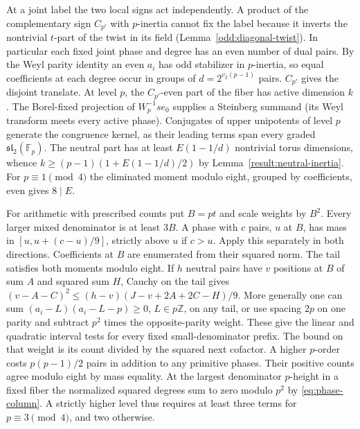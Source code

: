 \documentclass[11pt]{amsart}
\numberwithin{equation}{section}
\theoremstyle{definition}
\theoremstyle{plain}
\newcommand{\ZZ}{\mathbb Z}
\begin{document}
At a joint label the two local signs act independently. A product
of the complementary sign $C_{p'}$ with $p$-inertia cannot fix the
label because it inverts the nontrivial $t$-part of the twist in its
field (Lemma~\ref{odd:diagonal-twist}). In particular each fixed joint
phase and degree has an even number of dual pairs. By the Weyl parity
identity an even $a_i$ has odd stabilizer in $p$-inertia, so equal
coefficients at each degree occur in groups of $d=2^{v_2(p-1)}$ pairs.
$C_{p'}$ gives the disjoint translate. At level $p$, the $C_{p'}$-even
part of the fiber has active dimension $k$. The Borel-fixed projection
of $W_p^{-1}se_0$ supplies a Steinberg summand (its Weyl transform meets
every active phase). Conjugates of upper unipotents of level $p$ generate
the congruence kernel, as their leading terms span every graded
$\mathfrak{sl}_2(\mathbb F_p)$. The neutral part has at least $E(1-1/d)$
nontrivial torus dimensions, whence
$k\ge(p-1)(1+E(1-1/d)/2)$ by Lemma~\ref{result:neutral-inertia}.
For $p\equiv1\pmod4$ the eliminated moment modulo eight, grouped by
coefficients, even gives $8\mid E$.

For arithmetic with prescribed counts put $B=pt$ and scale weights by
$B^2$. Every larger mixed denominator is at least $3B$. A phase with
$c$ pairs, $u$ at $B$, has mass in $[u,u+(c-u)/9]$, strictly above $u$
if $c>u$. Apply this separately in both directions. Coefficients at $B$
are enumerated from their squared norm. The tail satisfies both moments
modulo eight. If $h$ neutral pairs have $v$ positions at $B$ of sum
$A$ and squared sum $H$, Cauchy on the tail gives
$(v-A-C)^2\le (h-v)(J-v+2A+2C-H)/9$. More generally one can sum
$(a_i-L)(a_i-L-p)\ge0$, $L\in p\ZZ$, on any tail, or use spacing
$2p$ on one parity and subtract $p^2$ times the opposite-parity weight.
These give the linear and quadratic interval tests for every fixed
small-denominator prefix. The bound on that weight is its count
divided by the squared next cofactor. A higher $p$-order costs
$p(p-1)/2$ pairs in addition to any primitive phases. Their positive
counts agree modulo eight by mass equality. At the largest denominator
$p$-height in a fixed fiber the normalized squared degrees sum to zero
modulo $p^2$ by \eqref{eq:phase-column}. A strictly higher level thus
requires at least three terms for $p\equiv3\pmod4$, and two otherwise.
\end{document}
